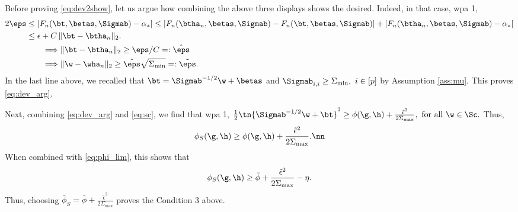 Before proving \eqref{eq:dev2show}, let us argue how combining the above three displays shows the desired. Indeed, in that case, wpa 1,
\begin{align*}
2\eps &\leq |F_n(\bt,\betas,\Sigmab)-\alpha_*| \leq |F_n(\btha_n,\betas,\Sigmab) - F_n(\bt,\betas,\Sigmab)| + |F_n(\btha_n,\betas,\Sigmab) - \alpha_*| \\
&\leq \epsilon + C \,\|\bt-\btha_n\|_2. \\
&\qquad\Longrightarrow \|\bt-\btha_n\|_2 \geq {\eps}/{C}=:\hat\eps\\
&\qquad\Longrightarrow \|\w-\wha_n\|_2 \geq \hat\eps\sqrt{\Sigma_{\min}}=:\tilde\eps.
\end{align*}
In the last line above, we recalled that $\bt=\Sigmab^{-1/2}\w+\betas$ and $\Sigmab_{i,i}\geq\Sigma_{\min},~i\in[p]$ by Assumption \ref{ass:mu}. This proves \eqref{eq:dev_arg}.

Next, combining \eqref{eq:dev_arg} and \eqref{eq:sc}, we find that wpa 1,
$
\frac{1}{2}\tn{\Sigmab^{-1/2}\w+\bt}^2 \geq \phi(\g,\h) + \frac{\tilde\epsilon^2}{2\Sigma_{\max}},~\text{for all}~ \w\in\Sc.
$
Thus, 
\begin{align}
\phi_S(\g,\h) \geq \phi(\g,\h) + \frac{\tilde\epsilon^2}{2\Sigma_{\max}}.\nn
\end{align}
When combined with \eqref{eq:phi_lim}, this shows that
\begin{align}
\phi_S(\g,\h) \geq \bar\phi + \frac{\tilde\epsilon^2}{2\Sigma_{\max}} - \eta.
\end{align}
Thus, choosing $\bar\phi_S = \bar\phi + \frac{\tilde\epsilon^2}{2\Sigma_{\max}}$ proves the Condition 3 above. 



